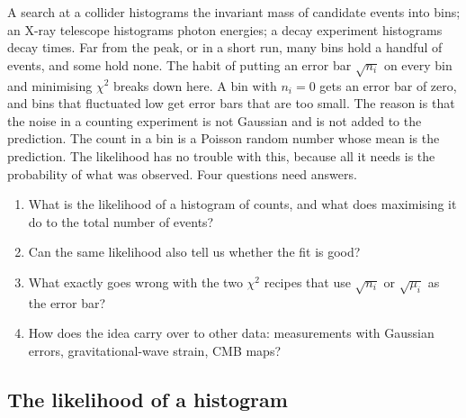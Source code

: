 A search at a collider histograms the invariant mass of candidate events
into bins; an X-ray telescope histograms photon energies; a decay experiment
histograms decay times. Far from the peak, or in a short run, many bins hold
a handful of events, and some hold none. The habit of putting an error bar
$\sqrt{n_i}$ on every bin and minimising $\chi^2$ breaks down here. A bin
with $n_i=0$ gets an error bar of zero, and bins that fluctuated low get
error bars that are too small. The reason is that the noise in a counting
experiment is not Gaussian and is not added to the prediction. The count in
a bin is a Poisson random number whose mean is the prediction. The
likelihood has no trouble with this, because all it needs is the
probability of what was observed. Four questions need answers.
\begin{enumerate}[label=\arabic*.]
  \item What is the likelihood of a histogram of counts, and what does
        maximising it do to the total number of events?
  \item Can the same likelihood also tell us whether the fit is good?
  \item What exactly goes wrong with the two $\chi^2$ recipes that use
        $\sqrt{n_i}$ or $\sqrt{\mu_i}$ as the error bar?
  \item How does the idea carry over to other data: measurements with
        Gaussian errors, gravitational-wave strain, CMB maps?
\end{enumerate}

\subsection{The likelihood of a histogram}
\label{3b:sec:poisson-like}

